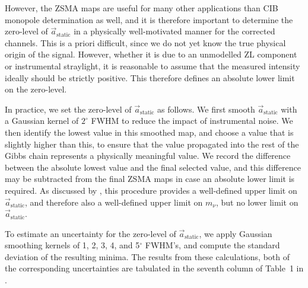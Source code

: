 \documentclass{aa}
\renewcommand{\a}[0]{\vec{a}}
\begin{document}
However, the ZSMA maps are useful for many other applications than CIB
monopole determination as well, and it is therefore important to
determine the zero-level of $\a_{\mathrm{static}}$ in a physically
well-motivated manner for the corrected channels. This is a priori
difficult, since we do not yet know the true physical origin of the
signal. However, whether it is due to an unmodelled ZL component or
instrumental straylight, it is reasonable to assume that the measured
intensity ideally should be strictly positive. This therefore defines
an absolute lower limit on the zero-level.

In practice, we set the zero-level of $\a_{\mathrm{static}}$ as
follows. We first smooth $\a_{\mathrm{static}}$ with a Gaussian kernel
of $2^{\circ}$ FWHM to reduce the impact of instrumental noise. We
then identify the lowest value in this smoothed map, and choose a
value that is slightly higher than this, to ensure that the value
propagated into the rest of the Gibbs chain represents a physically
meaningful value. We record the difference between the absolute lowest
value and the final selected value, and this difference may be
subtracted from the final ZSMA maps in case an absolute lower limit is
required. As discussed by \citet{CG02_03}, this procedure provides a
well-defined upper limit on $\a_{\mathrm{static}}$, and therefore also
a well-defined upper limit on $m_{\nu}$, but no lower limit on
$\a_{\mathrm{static}}$. 

To estimate an uncertainty for the zero-level of
$\a_{\mathrm{static}}$, we apply Gaussian smoothing kernels of 1, 2,
3, 4, and 5$^{\circ}$ FWHM's, and compute the standard deviation of
the resulting minima. The results from these calculations, both of the
corresponding uncertainties are tabulated in the seventh column of
Table~1 in \citet{CG02_03}.



\end{document}
